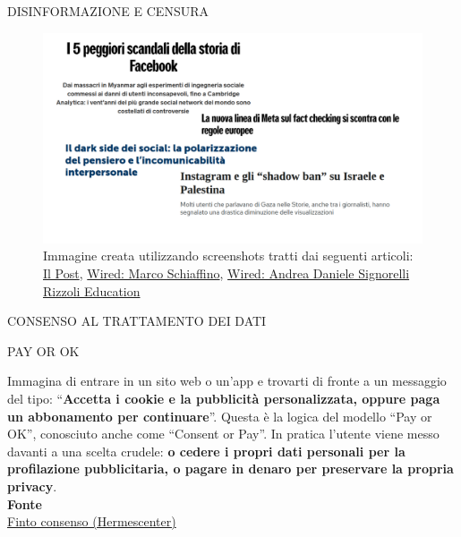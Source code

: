 \documentclass[aspectratio=1610]{beamer}
\begin{document}
\begin{frame}{DISINFORMAZIONE E CENSURA}
    \begin{figure}
        \includegraphics[width=.9\linewidth]{img/disinformazione.png}
        \caption{
            Immagine creata utilizzando screenshots tratti dai seguenti articoli:
            \href{https://www.ilpost.it/2023/10/19/shadow-ban-palestina-instagram/}{Il Post},
            \href{https://www.wired.it/article/meta-fact-checking-regole-europee-scorza/}{Wired: Marco Schiaffino},
            \href{https://www.wired.it/article/facebook-peggiori-scandali-cambridge-analytica-pubblicita-trump/}{Wired: Andrea Daniele Signorelli}
            \href{https://www.rizzolieducation.it/news/il-dark-side-dei-social-la-polarizzazione-del-pensiero-e-lincomunicabilita-interpersonale/}{Rizzoli Education}
        }
    \end{figure}
\end{frame}

\begin{frame}{CONSENSO AL TRATTAMENTO DEI DATI}
    \begin{alertblock}{PAY OR OK}
        \begin{minipage}{0.98\linewidth}
            \justifying
            Immagina di entrare in un sito web o un’app e trovarti di fronte a un 
            messaggio del tipo: ``\textbf{Accetta i cookie e la pubblicità personalizzata, 
            oppure paga un abbonamento per continuare}''. Questa è la logica del 
            modello ``Pay or OK'', conosciuto anche come ``Consent or Pay''. In pratica 
            l’utente viene messo davanti a una scelta crudele: \textbf{o cedere i propri dati 
            personali per la profilazione pubblicitaria, o pagare in denaro per preservare 
            la propria privacy}.\\
            \bigskip
            \tiny{\textbf{Fonte}}\\
            \tiny{\href{https://finto-consenso.hermescenter.org/problema/}{Finto consenso (Hermescenter)}}
        \end{minipage}
    \end{alertblock}
\end{frame}
\end{document}
